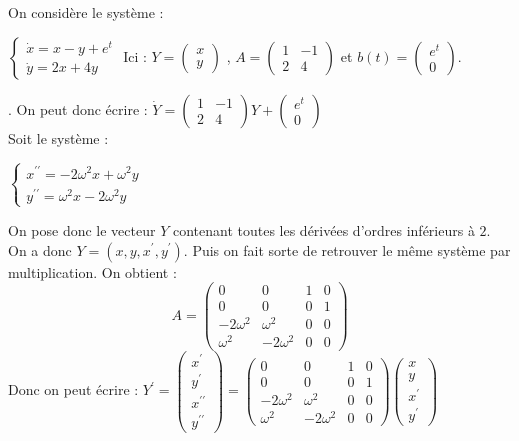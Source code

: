 \begin{ex}
On considère le système :\\
\begin{center}
    $\begin{cases}\dot x = x-y+e^t\\\dot y = 2x+4y\end{cases}$ Ici :  $Y=\begin{pmatrix} x \\ y\end{pmatrix}$ , $A=\begin{pmatrix}1&-1\\2&4\end{pmatrix}$ et $b(t)=\begin{pmatrix}e^t\\0\end{pmatrix}$.
\end{center}.
On peut donc écrire : $\dot Y = \begin{pmatrix}1&-1\\2&4\end{pmatrix}Y+\begin{pmatrix}e^t\\0\end{pmatrix}$\\
Soit le système :\\
\begin{center}
    $\begin{cases}x^{\prime\prime}=-2\omega^2x+\omega^2y\\y^{\prime\prime}=\omega^2x-2\omega^2y\end{cases}$
\end{center}
On pose donc le vecteur $Y$ contenant toutes les dérivées d'ordres inférieurs à $2$.\\
On a donc $Y=(x,y,x^{\prime},y^{\prime})$.
Puis on fait sorte de retrouver le même système par multiplication. On obtient :
$$A=\begin{pmatrix}0&0&1&0\\0&0&0&1\\-2\omega^2&\omega^2&0&0\\\omega^2&-2\omega^2&0&0\end{pmatrix}$$
Donc on peut écrire : $Y^{\prime}=\begin{pmatrix}x^{\prime}\\y^{\prime}\\x^{\prime\prime}\\y^{\prime\prime}\end{pmatrix}=\begin{pmatrix}0&0&1&0\\0&0&0&1\\-2\omega^2&\omega^2&0&0\\\omega^2&-2\omega^2&0&0\end{pmatrix}\begin{pmatrix}x\\y\\x^{\prime}\\y^{\prime}\end{pmatrix}$
\end{ex}

